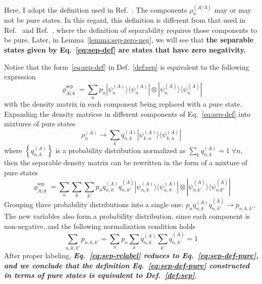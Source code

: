 \documentclass[12font]{article}
\numberwithin{equation}{section}    %
\theoremstyle{definition}
\newcommand{\bra}[1]{\langle #1 |}
\newcommand{\ket}[1]{| #1 \rangle}
\newcommand{\lrg}[1]{\left\{  #1  \right\}}
\newcommand{\mrm}[1]{\mathrm{#1}}
\begin{document}
Here, I adopt the definition used in Ref.~\cite{Guhne-Toth_2009}. The components $\rho^{(A/\overline{A})}_n$ may or may not be pure states. In this regard, this definition is different from that used in Ref.~\cite{Jungnitsch-Moroder-Guhne_2011} and Ref.~\cite{Lyu-Chandorkar-Kapoor-Takei-Sorensen-Witczak-Krempa_2026}, where the definition of separability requires those components to be pure. Later, in Lemma~\ref{lemma:sep-zero-neg}, we will see that \textbf{the separable states given by Eq.~\eqref{eq:sep-def} are states that have zero negativity.}

Notice that the form~\eqref{eq:sep-def} in Def.~\ref{def:sep} is equivalent to the following expression
\begin{equation}\label{eq:sep-def-pure}
    \varrho^{\mrm{sep}}_{A|\overline{A}} = \sum_{n} p_n \ket{\psi_n^{(A)}}\bra{\psi^{(A)}_n} \otimes \ket{\psi^{(\overline{A})}_n}\bra{\psi^{(\overline{A})}_n}
\end{equation}
with the density matrix in each component being replaced with a pure state. Expanding the density matrices in different components of Eq.~\eqref{eq:sep-def} into mixtures of pure states
\[
\rho_n^{(A)} \to \sum_{k} q^{(A)}_{n,k} \ket{\psi_{k,n}^{(A)}}\bra{\psi_{k,n}^{(A)}}
\]
where $\lrg{q^{(A)}_{n,k}}$ is a probability distribution normalized as $\sum_{k}q^{(A)}_{n,k} = 1 \;\forall n$, then the separable density matrix can be rewritten in the form of a mixture of pure states
\begin{equation}\label{eq:sep-relabel}
    \varrho^{\mrm{sep}}_{A|\overline{A}} 
    = 
    \sum_{n}  
    \sum_{k}
    \sum_{k'}
    p_n
    q^{(A)}_{n,k}
    q^{(\overline{A})}_{n,k'}
    \ket{\psi_{n,k}^{(A)}}\bra{\psi^{(A)}_{n,k}} 
    \otimes 
    \ket{\psi^{(\overline{A})}_{n.k'}}\bra{\psi^{(\overline{A})}_{n.k'}}
\end{equation}
Grouping three probability distributions into a single one: $p_nq^{(A)}_{n,k}q^{(\overline{A})}_{n,k'} \to p_{n,k,k'}$. The new variables also form a probability distribution, since each component is non-negative, and the following normalization condition holds
\[
\sum_{n,k,k'}  
p_{n,k,k'}
=
\sum_{n}  
p_n
\sum_{k}
q^{(A)}_{n,k}
\sum_{k'}
q^{(\overline{A})}_{n,k'}
=
1
\]
After proper labeling, \textbf{\textit{Eq.~\eqref{eq:sep-relabel} reduces to Eq.~\eqref{eq:sep-def-pure}, and we conclude that the definition Eq.~\eqref{eq:sep-def-pure} constructed in terms of pure states is equivalent to Def.~\ref{def:sep}}}.
\end{document}
